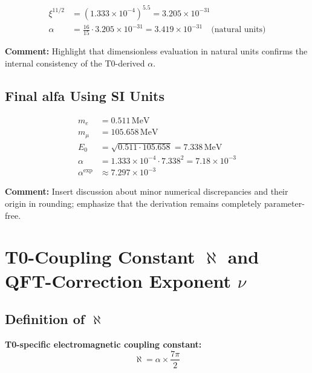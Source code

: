 \documentclass[12pt,a4paper]{article}
\newcommand{\xipar}{\xi}            %
\newcommand{\alphagem}{\alpha}      %
\newcommand{\nulep}{\nu}            %
\newcommand{\Ezero}{E_0}            %
\begin{document}
\begin{align}
	\xipar^{11/2} &= (1.333 \times 10^{-4})^{5.5} = 3.205 \times 10^{-31} \\
	\alphagem &= \frac{16}{15} \cdot 3.205 \times 10^{-31} = 3.419 \times 10^{-31} \quad \text{(natural units)}
\end{align}

\textbf{Comment:} Highlight that dimensionless evaluation in natural units confirms the internal consistency of the T0-derived $\alphagem$.

\subsection{Final alfa Using SI Units}

\begin{align}
	m_e &= 0.511\,\text{MeV} \\
	m_\mu &= 105.658\,\text{MeV} \\
	\Ezero &= \sqrt{0.511 \cdot 105.658} = 7.338\,\text{MeV} \\
	\alphagem &= 1.333 \times 10^{-4} \cdot 7.338^2 = 7.18 \times 10^{-3} \\
	\alphagem^{\text{exp}} &\approx 7.297 \times 10^{-3}
\end{align}

\textbf{Comment:} Insert discussion about minor numerical discrepancies and their origin in rounding; emphasize that the derivation remains completely parameter-free.
\section{T0-Coupling Constant $\aleph$ and QFT-Correction Exponent $\nulep$}

\subsection{Definition of $\aleph$}

\textbf{T0-specific electromagnetic coupling constant:}
\begin{equation}
	\aleph = \alphagem \times \frac{7\pi}{2}
\end{equation}
\end{document}

